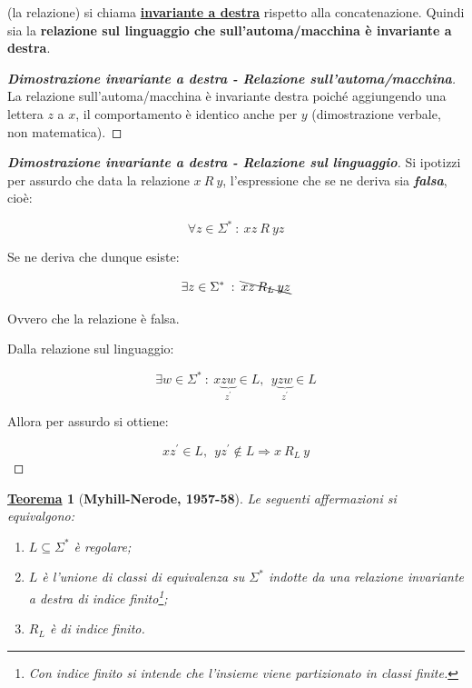 \documentclass[a4paper]{article}
\newtheorem{theorem}{\textcolor{Red3}{\underline{Teorema}}}
\begin{document}
	\noindent
	(la relazione) si chiama \textcolor{Red3}{\textbf{\underline{invariante a destra}}} rispetto alla concatenazione. Quindi sia la \textbf{relazione sul linguaggio che sull'automa/macchina è invariante a destra}.
	
	\newpage
	
	\begin{proof}[\textcolor{Red3}{\textbf{Dimostrazione invariante a destra - Relazione sull'automa/macchina}}]
		La relazione sull'automa/macchina è invariante destra poiché aggiungendo una lettera $z$ a $x$, il comportamento è identico anche per $y$ (dimostrazione verbale, non matematica).
	\end{proof}

	\begin{proof}[\textcolor{Red3}{\textbf{Dimostrazione invariante a destra - Relazione sul linguaggio}}]
		Si ipotizzi per assurdo che data la relazione $x \: R \: y$, l'espressione che se ne deriva sia \textbf{\emph{falsa}}, cioè:
		
		\begin{equation*}
			\forall z \in \Sigma^{*}  \: : \: xz \: R \: yz
		\end{equation*}
	
		\noindent
		Se ne deriva che dunque esiste:
		
		\begin{equation*}
			\exists z \in \Sigma^{*} \: : \: \bcancel{xz \: R_{L} \: yz}
		\end{equation*}
	
		\noindent
		Ovvero che la relazione è falsa.
		
		\noindent
		Dalla relazione sul linguaggio:
		
		\begin{equation*}
			\exists w \in \Sigma^{*} \: : \: x\underbrace{zw}_{z^{'}} \in L, \:\: y\underbrace{zw}_{z^{'}} \in L
		\end{equation*}
	
		\noindent
		Allora per assurdo si ottiene:
		
		\begin{equation*}
			xz^{'} \in L, \:\: yz^{'} \notin L \Longrightarrow x \: R_{L} \: y
		\end{equation*}
	\end{proof}
	
	\newpage
	
	\begin{theorem}[\textbf{Myhill-Nerode, 1957-58}]
		Le seguenti affermazioni si equivalgono:
		
		\begin{enumerate}
			\item $L \subseteq \Sigma^{*}$ è regolare;
			
			\item $L$ è l'unione di classi di equivalenza su $\Sigma^{*}$ indotte da una relazione invariante a destra di indice finito\footnote{Con indice finito si intende che l'insieme viene \emph{partizionato} in classi finite.};
			
			\item $R_{L}$ è di indice finito.
		\end{enumerate}
	\end{theorem}
\end{document}

